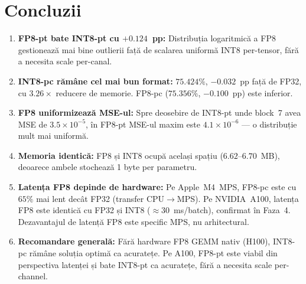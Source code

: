 \documentclass[12pt,a4paper]{article}
\begin{document}
\section{Concluzii}

\begin{enumerate}
  \item \textbf{FP8-pt bate INT8-pt cu $+0.124$~pp:} Distribuția
    logaritmică a FP8 gestionează mai bine outlierii față de scalarea
    uniformă INT8 per-tensor, fără a necesita scale per-canal.

  \item \textbf{INT8-pc rămâne cel mai bun format:} $75.424\%$,
    $-0.032$~pp față de FP32, cu $3.26\times$ reducere de memorie.
    FP8-pc ($75.356\%$, $-0.100$~pp) este inferior.

  \item \textbf{FP8 uniformizează MSE-ul:} Spre deosebire de INT8-pt
    unde block~7 avea MSE de $3.5 \times 10^{-5}$, în FP8-pt MSE-ul
    maxim este $4.1 \times 10^{-6}$ --- o distribuție mult mai uniformă.

  \item \textbf{Memoria identică:} FP8 și INT8 ocupă același spațiu
    ($6.62$--$6.70$~MB), deoarece ambele stochează 1 byte per parametru.

  \item \textbf{Latența FP8 depinde de hardware:} Pe Apple~M4~MPS,
    FP8-pc este cu $65\%$ mai lent decât FP32 (transfer CPU$\to$MPS).
    Pe NVIDIA~A100, latența FP8 este identică cu FP32 și INT8 ($\approx
    30$~ms/batch), confirmat în Faza~4. Dezavantajul de latență FP8
    este specific MPS, nu arhitectural.

  \item \textbf{Recomandare generală:} Fără hardware FP8 GEMM nativ
    (H100), INT8-pc rămâne soluția optimă ca acuratețe. Pe A100,
    FP8-pt este viabil din perspectiva latenței și bate INT8-pt ca
    acuratețe, fără a necesita scale per-channel.
\end{enumerate}
\end{document}
